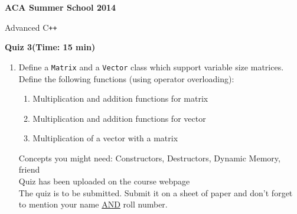 \documentclass[17pt]{extarticle}
\date{ }
\begin{document}
\begin{center}
\textbf{\LARGE{ACA Summer School 2014}}\vspace{.5cm}

\large{Advanced C\texttt{++}} \\ \vspace{.5cm}

\textbf{\large{Quiz 3}(Time: 15 min)}\\
\end{center}

\begin{enumerate}
\item Define a \texttt{Matrix} and a \texttt{Vector} class which support variable size matrices. Define the following functions (using operator overloading):
  \begin{enumerate}
  \item Multiplication and addition functions for matrix
  \item Multiplication and addition functions for vector
  \item Multiplication of a vector with a matrix 
  \end{enumerate}
  Concepts you might need: Constructors, Destructors, Dynamic Memory, friend\\
  Quiz has been uploaded on the course webpage\\
  The quiz is to be submitted. Submit it on a sheet of paper and don't forget to mention your name \underline{AND} roll number.
\end{enumerate}
\end{document}
